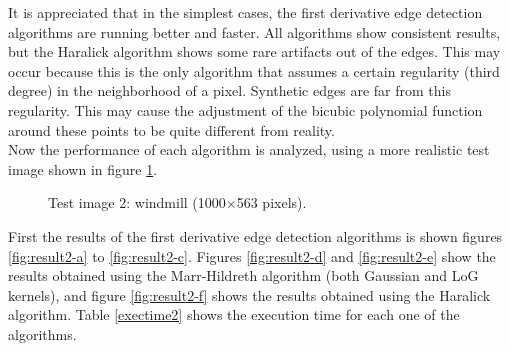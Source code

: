 \documentclass{ipol}
\numberwithin{equation}{section}
\numberwithin{table}{section}
\numberwithin{figure}{section}
\begin{document}
It is appreciated that in the simplest cases, the first derivative edge detection algorithms are running better and faster. All algorithms show consistent results, but the Haralick algorithm shows some rare artifacts out of the edges. This may occur because this is the only algorithm that assumes a certain regularity (third degree) in the neighborhood of a pixel. Synthetic edges are far from this regularity. This may cause the adjustment of the bicubic polynomial function around these points to be quite different from reality. \\

Now the performance of each algorithm is analyzed, using a more realistic test image shown in figure \ref{fig:original2}. \\

\begin{figure}[t!]
	\centering
	\quad
	\caption{Test image 2: windmill (1000$\times$563 pixels).}
	\label{fig:original2}
\end{figure}

First the results of the first derivative edge detection algorithms is shown figures \ref{fig:result2-a} to \ref{fig:result2-c}. Figures \ref{fig:result2-d} and \ref{fig:result2-e} show the results obtained using the Marr-Hildreth algorithm (both Gaussian and LoG kernels), and figure \ref{fig:result2-f} shows the results obtained using the Haralick algorithm. Table \ref{exectime2} shows the execution time for each one of the algorithms. \\
\end{document}
